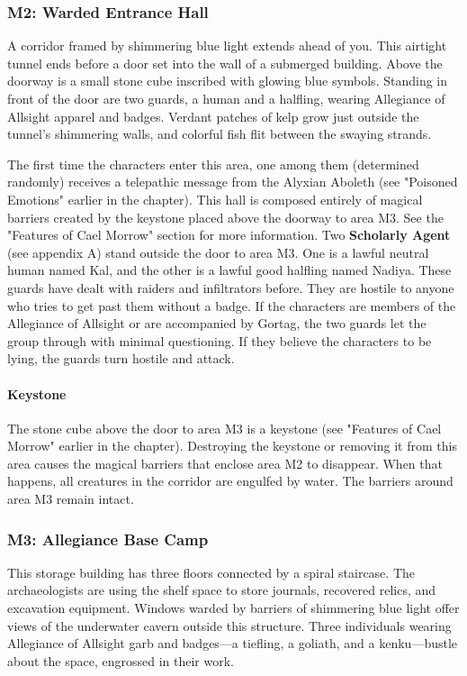 \documentclass[10pt,a4,twoside,twocolumn,openany,nodeprecatedcode]{dndbook}
\begin{document}
\subsubsection{M2: Warded Entrance Hall}
\begin{DndReadAloud}{}
A corridor framed by shimmering blue light extends ahead of you. This airtight tunnel ends before a door set into the wall of a submerged building. Above the doorway is a small stone cube inscribed with glowing blue symbols. Standing in front of the door are two guards, a human and a halfling, wearing Allegiance of Allsight apparel and badges. Verdant patches of kelp grow just outside the tunnel's shimmering walls, and colorful fish flit between the swaying strands.
\end{DndReadAloud}

The first time the characters enter this area, one among them (determined randomly) receives a telepathic message from the Alyxian Aboleth (see "Poisoned Emotions" earlier in the chapter).
This hall is composed entirely of magical barriers created by the keystone placed above the doorway to area M3. See the "Features of Cael Morrow" section for more information.
Two \textbf{Scholarly Agent} (see appendix A) stand outside the door to area M3. One is a lawful neutral human named Kal, and the other is a lawful good halfling named Nadiya.
These guards have dealt with raiders and infiltrators before. They are hostile to anyone who tries to get past them without a badge. If the characters are members of the Allegiance of Allsight or are accompanied by Gortag, the two guards let the group through with minimal questioning. If they believe the characters to be lying, the guards turn hostile and attack.
\paragraph{Keystone}
The stone cube above the door to area M3 is a keystone (see "Features of Cael Morrow" earlier in the chapter). Destroying the keystone or removing it from this area causes the magical barriers that enclose area M2 to disappear. When that happens, all creatures in the corridor are engulfed by water. The barriers around area M3 remain intact.
\subsubsection{M3: Allegiance Base Camp}
\begin{DndReadAloud}{}
This storage building has three floors connected by a spiral staircase. The archaeologists are using the shelf space to store journals, recovered relics, and excavation equipment. Windows warded by barriers of shimmering blue light offer views of the underwater cavern outside this structure.
Three individuals wearing Allegiance of Allsight garb and badges—a tiefling, a goliath, and a kenku—bustle about the space, engrossed in their work.
\end{DndReadAloud}
\end{document}
